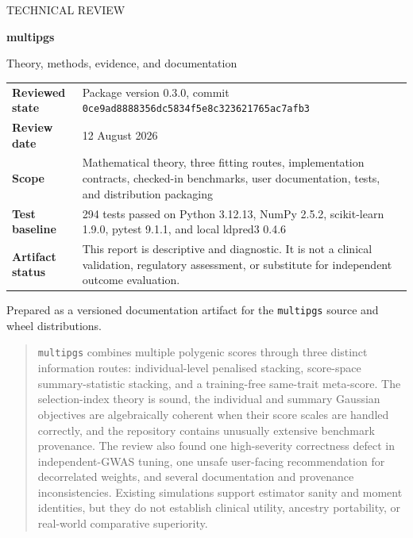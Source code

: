 \documentclass[10pt,a4paper]{article}
\newcommand{\pkg}[1]{\texttt{#1}}
\newcommand{\code}[1]{\texttt{#1}}
\begin{document}
\hypersetup{pageanchor=false}
\begin{titlepage}

\vspace*{19mm}
{\color{white}\sffamily
{\Large TECHNICAL REVIEW\par}
\vspace{8mm}
{\fontsize{30}{34}\selectfont\bfseries multipgs\par}
\vspace{3mm}
{\fontsize{19}{23}\selectfont Theory, methods, evidence, and documentation\par}
}

\vspace{49mm}
\begin{tabularx}{\linewidth}{@{}L{38mm}Y@{}}
\toprule
\textbf{Reviewed state} & Package version 0.3.0, commit
\code{0ce9ad8888356dc5834f5e8c323621765ac7afb3} \\
\textbf{Review date} & 12 August 2026 \\
\textbf{Scope} & Mathematical theory, three fitting routes, implementation
contracts, checked-in benchmarks, user documentation, tests, and distribution
packaging \\
\textbf{Test baseline} & 294 tests passed on Python 3.12.13, NumPy 2.5.2,
scikit-learn 1.9.0, pytest 9.1.1, and local ldpred3 0.4.6 \\
\textbf{Artifact status} & This report is descriptive and diagnostic. It is
not a clinical validation, regulatory assessment, or substitute for
independent outcome evaluation. \\
\bottomrule
\end{tabularx}

\vfill
{\small\textcolor{MidGray}{Prepared as a versioned documentation artifact for
the \pkg{multipgs} source and wheel distributions.}}
\end{titlepage}

\hypersetup{pageanchor=true}

\begin{abstract}
\pkg{multipgs} combines multiple polygenic scores through three distinct
information routes: individual-level penalised stacking, score-space
summary-statistic stacking, and a training-free same-trait meta-score. The
selection-index theory is sound, the individual and summary Gaussian objectives
are algebraically coherent when their score scales are handled correctly, and
the repository contains unusually extensive benchmark provenance. The review
also found one high-severity correctness defect in independent-GWAS tuning, one
unsafe user-facing recommendation for decorrelated weights, and several
documentation and provenance inconsistencies. Existing simulations support
estimator sanity and moment identities, but they do not establish clinical
utility, ancestry portability, or real-world comparative superiority.
\end{abstract}
\end{document}
